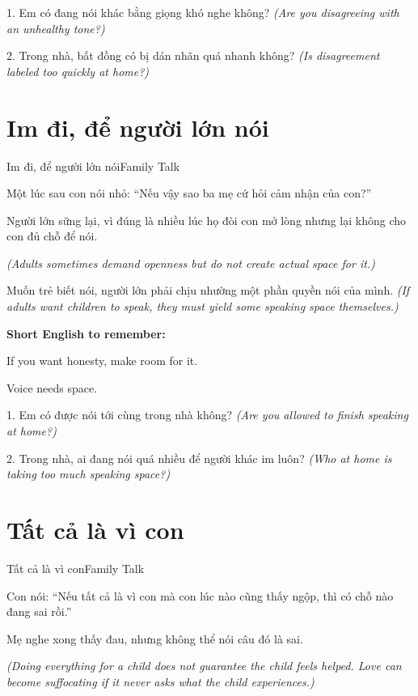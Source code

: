 \begin{tuhocnhanh}
1. Em có đang nói khác bằng giọng khó nghe không? \textit{(Are you disagreeing with an unhealthy tone?)}

2. Trong nhà, bất đồng có bị dán nhãn quá nhanh không? \textit{(Is disagreement labeled too quickly at home?)}
\end{tuhocnhanh}
\ngancach

\section{Im đi, để người lớn nói}
\begin{truyen}{Im đi, để người lớn nói}{Family Talk}

Một lúc sau con nói nhỏ: ``Nếu vậy sao ba mẹ cứ hỏi cảm nhận của con?''

Người lớn sững lại, vì đúng là nhiều lúc họ đòi con mở lòng nhưng lại không cho con đủ chỗ để nói.

\textit{(Adults sometimes demand openness but do not create actual space for it.)}
\end{truyen}

\begin{baihoc}
Muốn trẻ biết nói, người lớn phải chịu nhường một phần quyền nói của mình.
\textit{(If adults want children to speak, they must yield some speaking space themselves.)}
\end{baihoc}

\begin{ghinhoanh}
\textbf{Short English to remember:}

If you want honesty, make room for it.

Voice needs space.
\end{ghinhoanh}

\begin{tuhocnhanh}
1. Em có được nói tới cùng trong nhà không? \textit{(Are you allowed to finish speaking at home?)}

2. Trong nhà, ai đang nói quá nhiều để người khác im luôn? \textit{(Who at home is taking too much speaking space?)}
\end{tuhocnhanh}
\ngancach

\section{Tất cả là vì con}
\begin{truyen}{Tất cả là vì con}{Family Talk}

Con nói: ``Nếu tất cả là vì con mà con lúc nào cũng thấy ngộp, thì có chỗ nào đang sai rồi.''

Mẹ nghe xong thấy đau, nhưng không thể nói câu đó là sai.

\textit{(Doing everything for a child does not guarantee the child feels helped. Love can become suffocating if it never asks what the child experiences.)}
\end{truyen}


